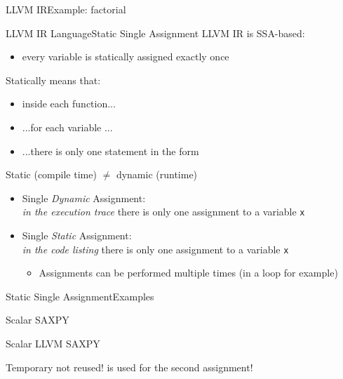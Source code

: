 \begin{frame}{LLVM IR}{Example: factorial}
\begin{center}
\begin{varwidth}{20cm}
\llvminput[\ttfamily\fontsize{7pt}{5pt}\selectfont]{snippet/fact.ll}
\end{varwidth}
\end{center}
\end{frame}


\begin{frame}{LLVM IR Language}{Static Single Assignment}
LLVM IR is SSA-based:

\begin{itemize}
\item every variable is \alert{statically assigned} exactly \alert{once}
\end{itemize}
\bigskip
Statically means that:

\begin{itemize}
\item inside each function...
\item ...for each variable ...
\item ...there is \alert{only one} statement in the form 
\end{itemize}
\bigskip
\alert{Static} (compile time) $\neq$ \alert{dynamic} (runtime)
{\footnotesize
\begin{itemize}
\item Single \emph{Dynamic} Assignment:\\\emph{in the execution trace} there is only one assignment to a variable \texttt{x}
\item Single \emph{Static} Assignment:\\\emph{in the code listing} there is only one assignment to a variable \texttt{x}
\begin{itemize}
\scriptsize
\item Assignments \alert{can} be performed multiple times (in a loop for example)
\end{itemize}
\end{itemize}
}
\end{frame}


\begin{frame}{Static Single Assignment}{Examples}
\begin{block}{Scalar SAXPY}
\end{block}

\begin{block}{Scalar LLVM SAXPY}
\end{block}

Temporary  not reused!  is used for the second
assignment!
\end{frame}


